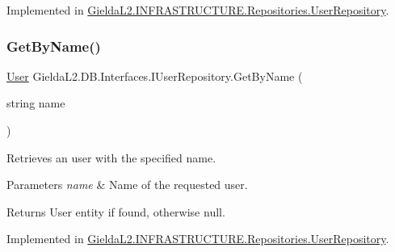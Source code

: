Implemented in \mbox{\hyperlink{class_gielda_l2_1_1_i_n_f_r_a_s_t_r_u_c_t_u_r_e_1_1_repositories_1_1_user_repository_a59783783c8210efff03a749d4f63fadf}{Gielda\+L2.\+I\+N\+F\+R\+A\+S\+T\+R\+U\+C\+T\+U\+R\+E.\+Repositories.\+User\+Repository}}.

\mbox{\label{interface_gielda_l2_1_1_d_b_1_1_interfaces_1_1_i_user_repository_a6bcf2b383638bfded753b394d1f4de0b}} 
\subsubsection{\texorpdfstring{GetByName()}{GetByName()}}
{\footnotesize\ttfamily \mbox{\hyperlink{class_gielda_l2_1_1_d_b_1_1_entities_1_1_user}{User}} Gielda\+L2.\+D\+B.\+Interfaces.\+I\+User\+Repository.\+Get\+By\+Name (\begin{DoxyParamCaption}\item[{string}]{name }\end{DoxyParamCaption})}



Retrieves an user with the specified name. 


\begin{DoxyParams}{Parameters}
{\em name} & Name of the requested user.\\
\hline
\end{DoxyParams}
\begin{DoxyReturn}{Returns}
User entity if found, otherwise null.
\end{DoxyReturn}


Implemented in \mbox{\hyperlink{class_gielda_l2_1_1_i_n_f_r_a_s_t_r_u_c_t_u_r_e_1_1_repositories_1_1_user_repository_af81e3935a282ab7b2e4d8bdf7b379771}{Gielda\+L2.\+I\+N\+F\+R\+A\+S\+T\+R\+U\+C\+T\+U\+R\+E.\+Repositories.\+User\+Repository}}.

\mbox{\label{interface_gielda_l2_1_1_d_b_1_1_interfaces_1_1_i_user_repository_a8a8920b50795c07316baf914e70f5ee3}} 
